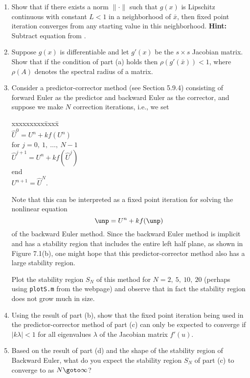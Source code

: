 \documentclass[10pt]{article}
\begin{document}
\begin{enumerate}
\item Show that if there exists a norm $\|\cdot\|$ such that $g(x)$ is
Lipschitz continuous with constant $L<1$ in a neighborhood of $\bar x$, then
fixed point iteration converges from any starting value in this
neighborhood.
{\bf Hint:} Subtract equation  from .

\item Suppose $g(x)$ is differentiable and let $g'(x)$ be the $s\times s$
Jacobian matrix.  Show that if the condition of part (a) holds then
$\rho(g'(\bar x)) < 1$, where $\rho(A)$ denotes the spectral radius of a
matrix.

\item Consider a predictor-corrector method (see Section 5.9.4) consisting
of forward Euler as the predictor and backward Euler as the corrector, and
suppose we make $N$ correction iterations, i.e., we set
\begin{tabbing}
xxxxxxxxx\=xxxx\=\kill\\
\>$\hat U^0 = U^n + kf(U^n)$\\
\>for $j = 0,~1,~\ldots,~N-1$\\
\>\>$\hat U^{j+1} = U^n + kf(\hat U^j)$\\
\>\>end\\
\>$U^{n+1} = \hat U^N$.
\end{tabbing}
Note that this can be interpreted as a fixed point iteration for solving the
nonlinear equation
\[
\unp = U^n + kf(\unp)
\]
of the backward Euler method.  Since the backward Euler method is implicit
and has a stability region that includes the entire left half plane, as
shown in Figure 7.1(b), one might hope that this predictor-corrector method
also has a large stability region.

Plot the stability region $S_N$
of this method for $N=2,~5,~10,~20$ (perhaps using
{\tt plotS.m} from the webpage) and observe that in fact the stability
region does not grow much in size.

\item Using the result of part (b), show that the fixed point iteration
being used in the predictor-corrector method of part (c) can only be
expected to converge if $|k\lambda| < 1$ for all eigenvalues $\lambda$ of the
Jacobian matrix $f'(u)$.  

\item Based on the result of part (d) and the shape of the stability region
of Backward Euler, what do you expect the stability region $S_N$ of part (c)
to converge to as $N\goto\infty$?

\end{enumerate}
\end{document}
